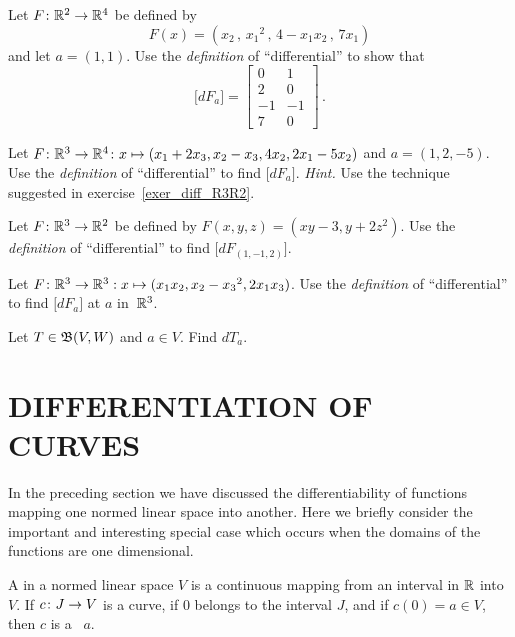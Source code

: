 \begin{prob}  Let $F \colon \mathbb{R}^2 \rightarrow \mathbb{R}^4$ be defined by
  \[ F(x) = (x_2\,,\,{x_1}^2\,,\,4 - x_1x_2\,,\,7x_1) \]
and let $a = (1,1)$. Use the \emph{definition} of ``differential'' to show that
  \[\bigl[dF_a\bigr] =
     \begin{bmatrix}
         0  &  1 \\
         2  &  0 \\
        -1  & -1 \\
         7  &  0
     \end{bmatrix}\,. \]
\end{prob}

\begin{prob}  Let $F \colon \mathbb{R}^3 \rightarrow \mathbb{R}^4\colon  x \mapsto (x_1 + 2x_3, x_2 - x_3, 4x_2,
2x_1 - 5x_2)$ and $a = (1,2,-5)$. Use the \emph{definition} of ``differential'' to find
$\bigl[dF_a\bigr]$.  \emph{Hint.} Use the technique suggested in
exercise~\ref{exer_diff_R3R2}.
\end{prob}

\begin{prob}  Let $F \colon \mathbb{R}^3 \rightarrow \mathbb{R}^2$ be defined by $F(x,y,z) = (xy - 3,y + 2z^2)$.
Use the \emph{definition} of ``differential'' to find $\bigl[dF_{(1,-1,2)}\bigr]$.
\end{prob}

\begin{prob}  Let $F \colon \mathbb{R}^3 \rightarrow \mathbb{R}^3: x \mapsto (x_1x_2,x_2 - {x_3}^2,2x_1x_3)$.  Use the
\emph{definition} of ``differential'' to find $\bigl[dF_a\bigr]$ at $a$ in~$\mathbb{R}^3$.
\end{prob}

\begin{prob}\label{prob_diff_lt} Let $T \in \mathfrak{B}(V,W)$ and $a \in V$. Find $dT_a$.
\end{prob}








\section{DIFFERENTIATION OF CURVES}\label{diff_curv} In the preceding section we have discussed
the differentiability of functions mapping one normed linear space into another. Here we
briefly consider the important and interesting special case which occurs when the domains of
the functions are one dimensional.
\begin{defn}  A
 in a normed linear space $V$ is a continuous mapping from an interval in $\mathbb{R}$
into~$V$.  If $c \colon J \rightarrow V$ is a curve, if $0$ belongs to the interval $J$, and if $c(0)
= a \in V$, then $c$ is a
~$a$.
\end{defn}

